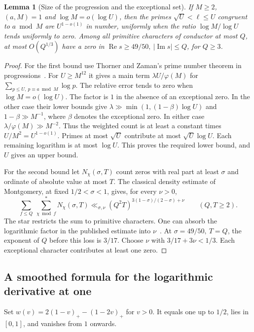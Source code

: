 \documentclass[a4paper,11pt]{article}
\newtheorem{lemma}[proposition]{Lemma}
\theoremstyle{definition}
\theoremstyle{remark}
\newcommand{\real}{\operatorname{Re}}\newcommand{\imag}{\operatorname{Im}}
\numberwithin{equation}{section}
\begin{document}
\begin{lemma}[Size of the progression and the exceptional set]\label{lem:dens11}
If \(M\ge2\), \((a,M)=1\) and \(\log M=o(\log U)\), then the primes \(\sqrt U<\ell\le U\) congruent to \(a\bmod M\) are \(U^{1-o(1)}\) in number, uniformly when the ratio \(\log M/\log U\) tends uniformly to zero. Among all primitive characters of conductor at most \(Q\), at most \(O(Q^{1/3})\) have a zero in \(\real s\ge49/50,\ |\imag s|\le Q\), for \(Q\ge3\).
\end{lemma}
\begin{proof}
For the first bound use Thorner and Zaman's prime number theorem in progressions~\cite[Cor.~1.4 and (1.2), (1.7)]{I-I-I-tz}. For \(U\ge M^{12}\) it gives a main term \(\lambda U/\varphi(M)\) for \(\sum_{p\le U,\ p\equiv a\bmod M}\log p\). The relative error tends to zero when \(\log M=o(\log U)\). The factor is \(1\) in the absence of an exceptional zero. In the other case their lower bounds give \(\lambda\gg\min(1,(1-\beta)\log U)\) and \(1-\beta\gg M^{-1}\), where \(\beta\) denotes the exceptional zero. In either case \(\lambda/\varphi(M)\gg M^{-2}\). Thus the weighted count is at least a constant times \(U/M^2=U^{1-o(1)}\). Primes at most \(\sqrt U\) contribute at most \(\sqrt U\log U\). Each remaining logarithm is at most \(\log U\). This proves the required lower bound, and \(U\) gives an upper bound.

For the second bound let \(N_\chi(\sigma,T)\) count zeros with real part at least \(\sigma\) and ordinate of absolute value at most \(T\). The classical density estimate of Montgomery, at fixed \(1/2<\sigma<1\), gives, for every \(\nu>0\),
\[
  \sum_{f\le Q}\ \sum_{\chi\bmod f}^{*}N_\chi(\sigma,T)
       \ll_{\sigma,\nu}(Q^2T)^{3(1-\sigma)/(2-\sigma)+\nu}
       \qquad(Q,T\ge 2).
\]
The star restricts the sum to primitive characters. One can absorb the logarithmic factor in the published estimate into \(\nu\)~\cite[Thm.~1]{I-I-I-mont}. At \(\sigma=49/50,\ T=Q\), the exponent of \(Q\) before this loss is \(3/17\). Choose \(\nu\) with \(3/17+3\nu<1/3\). Each exceptional character contributes at least one zero.
\end{proof}

\subsection{A smoothed formula for the logarithmic derivative at one}\label{nav:I-19}
Set \(w(v)=2(1-v)_+-(1-2v)_+\) for \(v>0\). It equals one up to \(1/2\), lies in \([0,1]\), and vanishes from \(1\) onwards.
\end{document}
